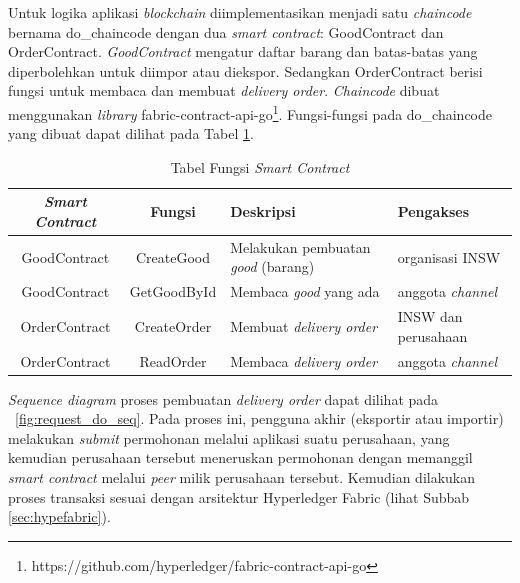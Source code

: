 Untuk logika aplikasi \textit{blockchain} diimplementasikan menjadi satu \textit{chaincode} bernama do\_chaincode dengan dua \textit{smart contract}: GoodContract dan OrderContract. \textit{GoodContract} mengatur daftar barang dan batas-batas yang diperbolehkan untuk diimpor atau diekspor. Sedangkan OrderContract berisi fungsi untuk membaca dan membuat \textit{delivery order}. \textit{Chaincode} dibuat menggunakan \textit{library} fabric-contract-api-go\footnote{https://github.com/hyperledger/fabric-contract-api-go}. Fungsi-fungsi pada do\_chaincode yang dibuat dapat dilihat pada Tabel \ref{table:smartcontract}. 

\begin{center}
\begin{table}
\caption{Tabel Fungsi \textit{Smart Contract}}
\begin{tabular}{ |c|c|p{5cm}|p{3cm}| } 
 \hline
 \textit{\textbf{Smart Contract}} & \textbf{Fungsi} & \textbf{Deskripsi} & \textbf{Pengakses} \\ 
 \hline
 GoodContract & CreateGood & Melakukan pembuatan \textit{good} (barang) & organisasi INSW \\ 
 \hline
 GoodContract & GetGoodById & Membaca \textit{good} yang ada & anggota \textit{channel} \\ 
 \hline
 OrderContract & CreateOrder & Membuat \textit{delivery order} & INSW dan perusahaan \\
 \hline
 OrderContract & ReadOrder & Membaca \textit{delivery order} & anggota \textit{channel} \\
 \hline
\end{tabular}

\label{table:smartcontract}
\end{table}
\end{center}


\textit{Sequence diagram} proses pembuatan \textit{delivery order} dapat dilihat pada \pic~\ref{fig:request_do_seq}. Pada proses ini, pengguna akhir (eksportir atau importir) melakukan \textit{submit} permohonan melalui aplikasi suatu perusahaan, yang kemudian perusahaan tersebut meneruskan permohonan dengan memanggil \textit{smart contract} melalui \textit{peer} milik perusahaan tersebut. Kemudian dilakukan proses transaksi sesuai dengan arsitektur Hyperledger Fabric (lihat Subbab \ref{sec:hypefabric}).

